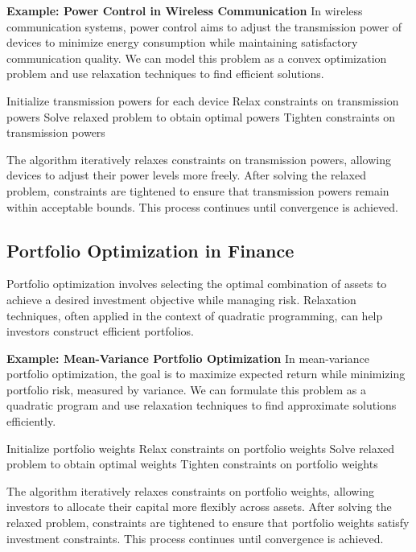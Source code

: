 \documentclass[12pt]{book} %
\begin{document}
\textbf{Example: Power Control in Wireless Communication}
In wireless communication systems, power control aims to adjust the transmission power of devices to minimize energy consumption while maintaining satisfactory communication quality. We can model this problem as a convex optimization problem and use relaxation techniques to find efficient solutions.
\FloatBarrier
\begin{algorithm}
\caption{Relaxation-based Power Control Algorithm}
\begin{algorithmic}[1]
\State Initialize transmission powers for each device
\Repeat
    \State Relax constraints on transmission powers
    \State Solve relaxed problem to obtain optimal powers
    \State Tighten constraints on transmission powers
\end{algorithmic}
\end{algorithm}
\FloatBarrier
The algorithm iteratively relaxes constraints on transmission powers, allowing devices to adjust their power levels more freely. After solving the relaxed problem, constraints are tightened to ensure that transmission powers remain within acceptable bounds. This process continues until convergence is achieved.

\subsection{Portfolio Optimization in Finance}
Portfolio optimization involves selecting the optimal combination of assets to achieve a desired investment objective while managing risk. Relaxation techniques, often applied in the context of quadratic programming, can help investors construct efficient portfolios.

\textbf{Example: Mean-Variance Portfolio Optimization}
In mean-variance portfolio optimization, the goal is to maximize expected return while minimizing portfolio risk, measured by variance. We can formulate this problem as a quadratic program and use relaxation techniques to find approximate solutions efficiently.
\FloatBarrier
\begin{algorithm}
\caption{Relaxation-based Mean-Variance Portfolio Optimization}
\begin{algorithmic}[1]
\State Initialize portfolio weights
\Repeat
    \State Relax constraints on portfolio weights
    \State Solve relaxed problem to obtain optimal weights
    \State Tighten constraints on portfolio weights
\end{algorithmic}
\end{algorithm}
\FloatBarrier
The algorithm iteratively relaxes constraints on portfolio weights, allowing investors to allocate their capital more flexibly across assets. After solving the relaxed problem, constraints are tightened to ensure that portfolio weights satisfy investment constraints. This process continues until convergence is achieved.
\end{document}
